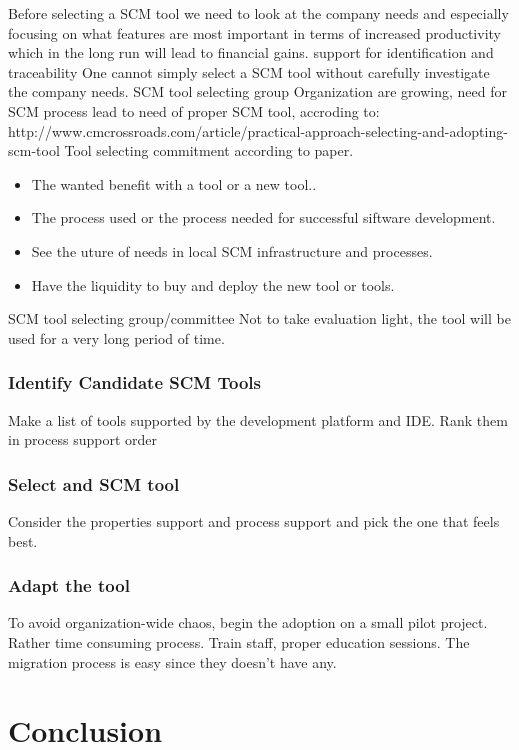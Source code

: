\documentclass[10pt]{article}
\begin{document}
Before selecting a SCM tool we need to look at the company needs and especially focusing on what features are most important in terms of increased productivity which in the long run will lead to financial gains. 
support for identification and traceability
One cannot simply select a SCM tool without carefully investigate the company needs.
SCM tool selecting group
Organization are growing, need for SCM process lead to need of proper SCM tool,  accroding to: http://www.cmcrossroads.com/article/practical-approach-selecting-and-adopting-scm-tool
Tool selecting commitment according to paper. 
\begin{itemize}
\item The wanted benefit with a tool or a new tool..
\item The process used or the process needed for successful siftware development.
\item See the uture of needs in local SCM infrastructure and processes.
\item Have the liquidity to buy and deploy the new tool or tools.
\end{itemize}
SCM tool selecting group/committee
Not to take evaluation light, the tool will be used for a very long period of time.

\subsubsection{Identify Candidate SCM Tools}
Make a list of tools supported by the development platform and IDE. Rank them in process support order

\subsubsection{Select and SCM tool}
Consider the properties support and process support and pick the one that feels best.

\subsubsection{Adapt the tool}
To avoid organization-wide chaos, begin the adoption on a small pilot project. Rather time consuming process.
Train staff, proper education sessions.
The migration process is easy since they doesn't have any.


\section{Conclusion}
\end{document}
